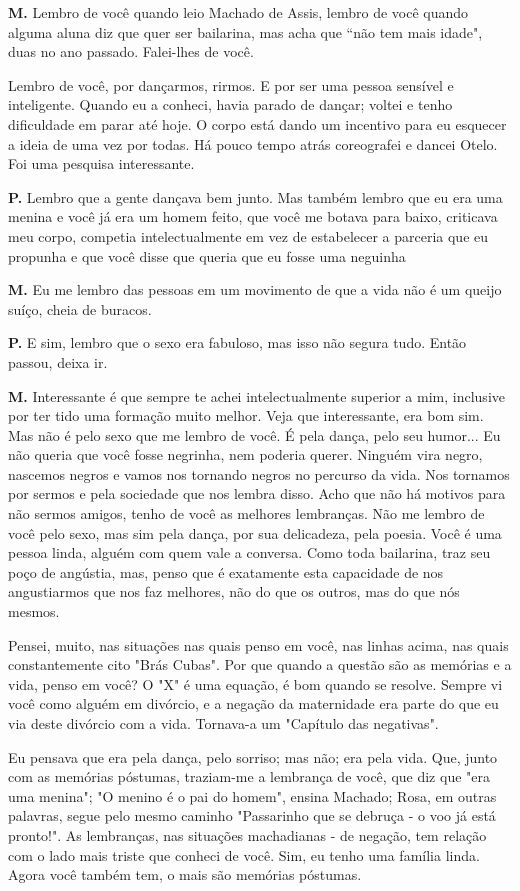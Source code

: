 \textbf{M.} Lembro de você quando leio Machado de Assis, lembro de você
quando alguma aluna diz que quer ser bailarina, mas acha que ``não tem
mais idade", duas no ano passado. Falei-lhes de você.

Lembro de você, por dançarmos, rirmos. E por ser uma pessoa sensível e
inteligente. Quando eu a conheci, havia parado de dançar; voltei e tenho
dificuldade em parar até hoje. O corpo está dando um incentivo para eu
esquecer a ideia de uma vez por todas. Há pouco tempo atrás coreografei
e dancei Otelo. Foi uma pesquisa interessante.

\textbf{P.} Lembro que a gente dançava bem junto. Mas também lembro que
eu era uma menina e você já era um homem feito, que você me botava para
baixo, criticava meu corpo, competia intelectualmente em vez de
estabelecer a parceria que eu propunha e que você disse que queria que
eu fosse uma neguinha

\textbf{M.} Eu me lembro das pessoas em um movimento de que a vida não é
um queijo suíço, cheia de buracos.

\textbf{P.} E sim, lembro que o sexo era fabuloso, mas isso não segura
tudo. Então passou, deixa ir.

\textbf{M.} Interessante é que sempre te achei intelectualmente superior
a mim, inclusive por ter tido uma formação muito melhor. Veja que
interessante, era bom sim. Mas não é pelo sexo que me lembro de você. É
pela dança, pelo seu humor... Eu não queria que você fosse negrinha, nem
poderia querer. Ninguém vira negro, nascemos negros e vamos nos tornando
negros no percurso da vida. Nos tornamos por sermos e pela sociedade que
nos lembra disso. Acho que não há motivos para não sermos amigos, tenho
de você as melhores lembranças. Não me lembro de você pelo sexo, mas sim
pela dança, por sua delicadeza, pela poesia. Você é uma pessoa linda,
alguém com quem vale a conversa. Como toda bailarina, traz seu poço de
angústia, mas, penso que é exatamente esta capacidade de nos
angustiarmos que nos faz melhores, não do que os outros, mas do que nós
mesmos.

Pensei, muito, nas situações nas quais penso em você, nas linhas acima,
nas quais constantemente cito "Brás Cubas". Por que quando a questão são
as memórias e a vida, penso em você? O "X" é uma equação, é bom quando
se resolve. Sempre vi você como alguém em divórcio, e a negação da
maternidade era parte do que eu via deste divórcio com a vida. Tornava-a
um "Capítulo das negativas".

Eu pensava que era pela dança, pelo sorriso; mas não; era pela vida.
Que, junto com as memórias póstumas, traziam-me a lembrança de você, que
diz que "era uma menina"; "O menino é o pai do homem", ensina Machado;
Rosa, em outras palavras, segue pelo mesmo caminho "Passarinho que se
debruça - o voo já está pronto!". As lembranças, nas situações
machadianas - de negação, tem relação com o lado mais triste que conheci
de você. Sim, eu tenho uma família linda. Agora você também tem, o mais
são memórias póstumas.

